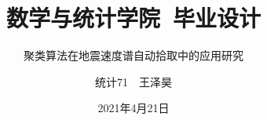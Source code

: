 



\usepackage{longtable}
\usepackage{newtxtext,newtxmath}
\usepackage[backend=biber,style=gb7714-2015, gbnamefmt=lowercase, 
maxcitenames=2,
mincitenames=1, 
gbcitelocal=gb7714-2015,
gbpub=false,
doi=false,
isbn=false,
url=false,
eprint=false]{biblatex}

\hypersetup{pdfpagemode=FullScreen}
\usepackage{ctex}
\setmainfont{Times New Roman}
\usepackage{graphicx}
\usepackage{amsmath}
\usepackage{amsfonts}
\usepackage{subfigure}

\author{统计71~~王泽昊}

\date{2021年4月21日}

\title{数学与统计学院~毕业设计}
\subtitle[本科毕业设计]{聚类算法在地震速度谱自动拾取中的应用研究}

\graphicspath{{images/}}
